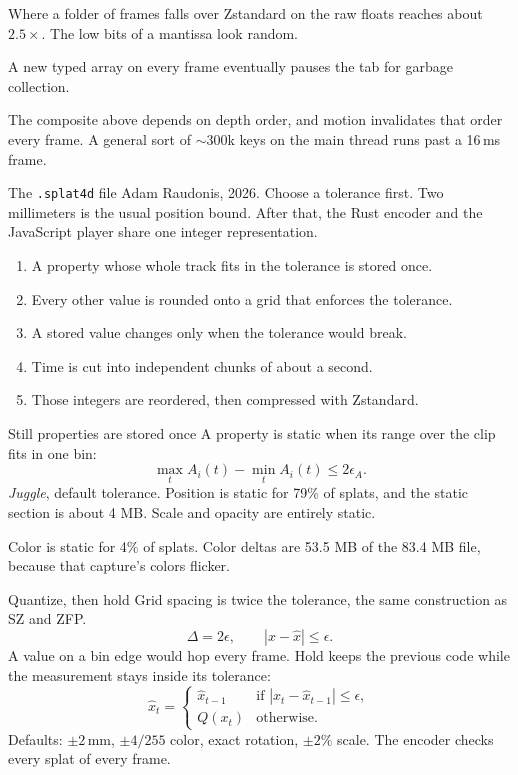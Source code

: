 \documentclass[aspectratio=169,10pt]{beamer}
\begin{document}
\begin{frame}{Where a folder of frames falls over}
  Zstandard on the raw floats reaches about $2.5\times$. The low bits of a mantissa look random.

  \vspace{0.8em}
  A new typed array on every frame eventually pauses the tab for garbage collection.

  \vspace{0.8em}
  The composite above depends on depth order, and motion invalidates that order every frame. A general sort of $\sim$300k keys on the main thread runs past a 16\,ms frame.
\end{frame}

\begin{frame}{The \texttt{.splat4d} file}
  Adam Raudonis, 2026. Choose a tolerance first. Two millimeters is the usual position bound. After that, the Rust encoder and the JavaScript player share one integer representation.

  \vspace{0.5em}
  \begin{enumerate}
    \item A property whose whole track fits in the tolerance is stored once.
    \item Every other value is rounded onto a grid that enforces the tolerance.
    \item A stored value changes only when the tolerance would break.
    \item Time is cut into independent chunks of about a second.
    \item Those integers are reordered, then compressed with Zstandard.
  \end{enumerate}
\end{frame}

\begin{frame}{Still properties are stored once}
  A property is static when its range over the clip fits in one bin:
  \[
    \max_t A_i(t)-\min_t A_i(t)\le 2\epsilon_A.
  \]
  \textit{Juggle}, default tolerance. Position is static for 79\% of splats, and the static section is about 4 MB. Scale and opacity are entirely static.

  \vspace{0.5em}
  Color is static for 4\% of splats. Color deltas are 53.5 MB of the 83.4 MB file, because that capture's colors flicker.
\end{frame}

\begin{frame}{Quantize, then hold}
  Grid spacing is twice the tolerance, the same construction as SZ and ZFP.
  \[
    \Delta=2\epsilon, \qquad |x-\hat{x}|\le\epsilon.
  \]
  A value on a bin edge would hop every frame. Hold keeps the previous code while the measurement stays inside its tolerance:
  \[
    \hat{x}_t=
    \begin{cases}
      \hat{x}_{t-1} & \text{if }|x_t-\hat{x}_{t-1}|\le\epsilon,\\
      Q(x_t) & \text{otherwise.}
    \end{cases}
  \]
  Defaults: $\pm 2$\,mm, $\pm 4/255$ color, exact rotation, $\pm 2\%$ scale. The encoder checks every splat of every frame.
\end{frame}
\end{document}
